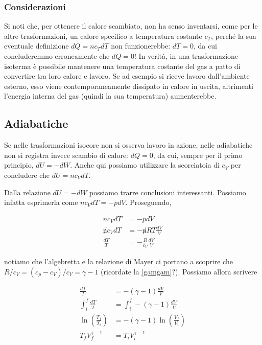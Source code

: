 \subsubsection*{Considerazioni}
Si noti che, per ottenere il calore scambiato, non ha
senso inventarsi, come per le altre trasformazioni, un calore specifico
a temperatura costante $c_T$, perché la sua eventuale definizione
$dQ = nc_TdT$ non funzionerebbe: $dT = 0$, da cui concluderemmo erroneamente che
$dQ = 0$! In verità, in una trasformazione isoterma è possibile
mantenere una temperatura costante del gas a patto di convertire tra
loro calore e lavoro. Se ad esempio si riceve lavoro dall'ambiente esterno,
esso viene contemporaneamente dissipato in calore in uscita, altrimenti
l'energia interna del gas (quindi la sua temperatura) aumenterebbe.


\subsection{Adiabatiche}
Se nelle trasformazioni isocore non si osserva lavoro in azione, nelle
adiabatiche non si registra invece scambio di calore: $dQ = 0$, da cui,
sempre per il primo principio, $dU = -dW$. Anche qui possiamo utilizzare
la scorciatoia di $c_V$ per concludere che $dU = nc_VdT$.

Dalla relazione $dU = -dW$ possiamo trarre conclusioni interessanti.
Possiamo infatta esprimerla come $nc_VdT = -pdV$. Proseguendo,

\begin{align*}
    nc_VdT &= -pdV\\
    \not n c_VdT &= -\not n RT\frac{dV}{V}\\
    \frac{dT}{T} &= -\frac{R}{c_V}\frac{dV}{V}
\end{align*}

\noindent notiamo che l'algebretta e la relazione di Mayer
ci portano a scoprire che $R/c_V = (c_p - c_V)/c_V = \gamma - 1$
(ricordate la \ref{gamgam}?). Possiamo allora scrivere

\begin{align*}
    \frac{dT}{T} &= -(\gamma - 1)\frac{dV}{V}\\
    \int_{i}^{f}\frac{dT}{T} &= \int_{i}^{f}-(\gamma - 1)\frac{dV}{V}\\
    \ln\left(\frac{T_f}{T_i}\right) &= -(\gamma - 1)\ln\left(\frac{V_f}{V_i}\right)\\
    T_fV_f^{\gamma - 1} &= T_iV_i^{\gamma - 1}
\end{align*}

